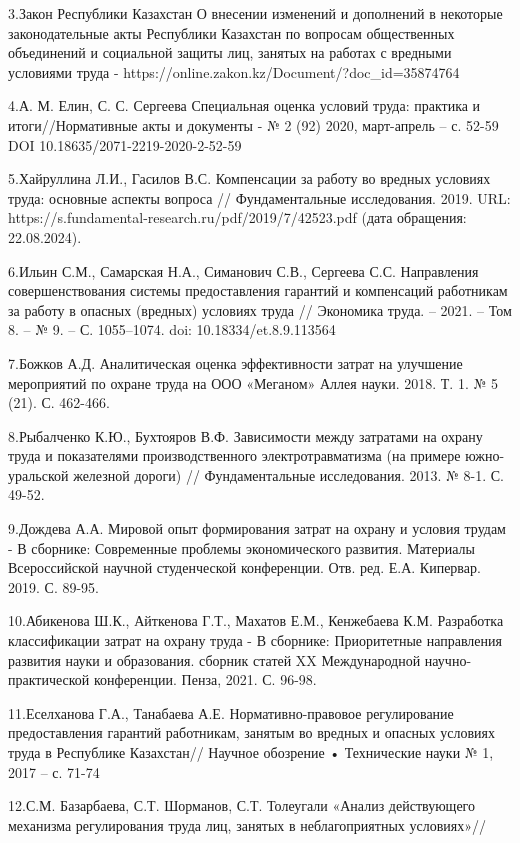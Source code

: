 3.Закон Республики Казахстан О внесении изменений и дополнений в
некоторые законодательные акты Республики Казахстан по вопросам
общественных объединений и социальной защиты лиц, занятых на работах с
вредными условиями труда -
https://online.zakon.kz/Document/?doc\_id=35874764

4.А. М. Елин, С. С. Сергеева Специальная оценка условий труда: практика
и итоги//Нормативные акты и документы - № 2 (92) 2020, март-апрель -- с.
52-59 DOI 10.18635/2071-2219-2020-2-52-59

5.Хайруллина Л.И., Гасилов В.С. Компенсации за работу во вредных
условиях труда: основные аспекты вопроса // Фундаментальные
исследования. 2019. URL:
https://s.fundamental-research.ru/pdf/2019/7/42523.pdf (дата обращения:
22.08.2024).

6.Ильин С.М., Самарская Н.А., Симанович С.В., Сергеева С.С. Направления
совершенствования системы предоставления гарантий и компенсаций
работникам за работу в опасных (вредных) условиях труда // Экономика
труда. -- 2021. -- Том 8. -- № 9. -- С. 1055--1074. doi:
10.18334/et.8.9.113564

7.Божков А.Д. Аналитическая оценка эффективности затрат на улучшение
мероприятий по охране труда на ООО «Меганом» Аллея науки. 2018. Т. 1. №
5 (21). С. 462-466.

8.Рыбалченко К.Ю., Бухтояров В.Ф. Зависимости между затратами на охрану
труда и показателями производственного электротравматизма (на примере
южно-уральской железной дороги) // Фундаментальные исследования. 2013. №
8-1. С. 49-52.

9.Дождева А.А. Мировой опыт формирования затрат на охрану и условия
трудам - В сборнике: Современные проблемы экономического развития.
Материалы Всероссийской научной студенческой конференции. Отв. ред. Е.А.
Кипервар. 2019. С. 89-95.

10.Абикенова Ш.К., Айткенова Г.Т., Махатов Е.М., Кенжебаева К.М.
Разработка классификации затрат на охрану труда - В сборнике:
Приоритетные направления развития науки и образования. сборник статей XX
Международной научно-практической конференции. Пенза, 2021. С. 96-98.

11.Еселханова Г.А., Танабаева А.Е. Нормативно-правовое регулирование
предоставления гарантий работникам, занятым во вредных и опасных
условиях труда в Республике Казахстан// Научное обозрение • Технические
науки № 1, 2017 -- с. 71-74

12.С.М. Базарбаева, С.Т. Шорманов, С.Т. Толеугали «Анализ действующего
механизма регулирования труда лиц, занятых в неблагоприятных условиях»//

